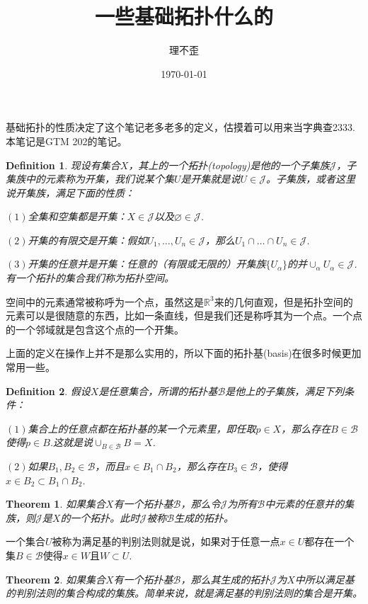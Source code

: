 \documentclass[10pt]{book}
\theoremstyle{plain}%
\newtheorem{theo}{Theorem}%
\newtheorem{defi}{Definition}%
\newcommand{\no}[1]{{$(#1)$}}%
\begin{document}
\title{一些基础拓扑什么的}
\author{理不歪}
\date{\today}
\maketitle %
基础拓扑的性质决定了这个笔记老多老多的定义，估摸着可以用来当字典查2333.本笔记是GTM 202的笔记。
\begin{defi}
现设有集合$X$，其上的一个拓扑(topology)是他的一个子集族$\mathcal{J}$，子集族中的元素称为开集，我们说某个集$U$是开集就是说$U \in \mathcal{J}$。子集族，或者这里说开集族，满足下面的性质：

\no{1}全集和空集都是开集：$X\in \mathcal{J}$以及$\varnothing\in \mathcal{J}$.

\no{2}开集的有限交是开集：假如$U_1,\dots,U_n \in \mathcal{J}$，那么$U_1\cap\dots\cap U_n\in \mathcal{J}$.

\no{3}开集的任意并是开集：任意的（有限或无限的）开集族$\{U_\alpha\}$的并$\cup_\alpha U_\alpha \in \mathcal{J}$.\\
有一个拓扑的集合我们称为拓扑空间。
\end{defi}

空间中的元素通常被称呼为一个点，虽然这是$\mathbb{R}^3$来的几何直观，但是拓扑空间的元素可以是很随意的东西，比如一条直线，但是我们还是称呼其为一个点。一个点的一个邻域就是包含这个点的一个开集。

上面的定义在操作上并不是那么实用的，所以下面的拓扑基(basis)在很多时候更加常用一些。
\begin{defi}
假设$X$是任意集合，所谓的拓扑基$\mathcal{B}$是他上的子集族，满足下列条件：

\no{1}集合上的任意点都在拓扑基的某一个元素里，即任取$p \in X$，那么存在$B \in \mathcal{B}$使得$p \in B$.这就是说$\cup_{B \in \mathcal{B}} B = X$.

\no{2}如果$B_1,B_2\in \mathcal{B}$，而且$x \in B_1 \cap B_2$，那么存在$B_3 \in \mathcal{B}$，使得$x \in B_2 \subset B_1 \cap B_2$.
\end{defi}

\begin{theo}
如果集合$X$有一个拓扑基$\mathcal{B}$，那么令$\mathcal{J}$为所有$\mathcal{B}$中元素的任意并的集族，则$\mathcal{J}$是$X$的一个拓扑。此时$\mathcal{J}$被称$\mathcal{B}$生成的拓扑。
\end{theo}

一个集合$U$被称为满足基的判别法则就是说，如果对于任意一点$x\in U$都存在一个集$B\in \mathcal{B}$使得$x \in W$且$W\subset U$.

\begin{theo}
如果集合$X$有一个拓扑基$\mathcal{B}$，那么其生成的拓扑$\mathcal{J}$为$X$中所以满足基的判别法则的集合构成的集族。简单来说，就是满足基的判别法则的集合是开集。
\end{theo}
\end{document}
